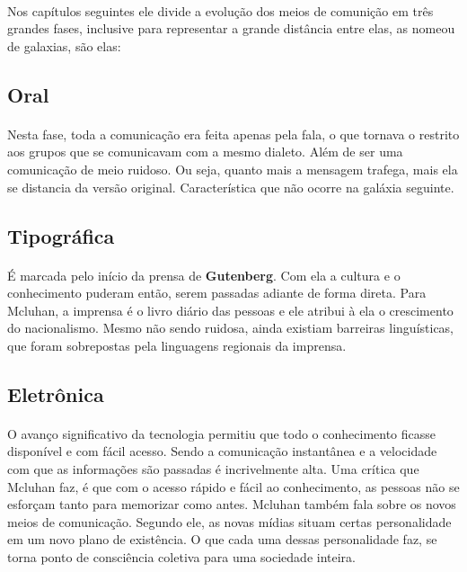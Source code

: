 \documentclass[12pt,a4paper]{article}
\begin{document}
\paragraph{}
Nos capítulos seguintes ele divide a evolução dos meios de comunição \cite{youtube:abc_monday_conference} em três grandes fases, inclusive para representar a grande distância entre elas, as nomeou de galaxias, são elas:

\subsection{Oral}
\paragraph{}
Nesta fase, toda a comunicação era feita apenas pela fala, o que tornava o  restrito aos grupos que se comunicavam com a mesmo dialeto. Além de ser uma comunicação de meio ruidoso. Ou seja, quanto mais a mensagem trafega, mais ela se distancia da versão original. Característica que não ocorre na galáxia seguinte.

\subsection{Tipográfica}

\paragraph{}
É marcada pelo início da prensa de \textbf{Gutenberg}.
Com ela a cultura e o conhecimento puderam então, serem passadas adiante de forma direta.
Para Mcluhan, a imprensa é o livro diário das pessoas e ele atribui à ela o crescimento do nacionalismo. 
Mesmo não sendo ruidosa, ainda existiam barreiras linguísticas, que foram sobrepostas pela linguagens regionais da imprensa.

\subsection{Eletrônica}
\paragraph{}
O avanço significativo da tecnologia permitiu que todo o conhecimento ficasse disponível e com fácil acesso.
Sendo a comunicação instantânea e a velocidade com que as informações são passadas é incrivelmente alta.
Uma crítica que Mcluhan\cite{wiki:marshall_mcluhan} faz, é que com o acesso rápido e fácil ao conhecimento, as pessoas não se esforçam tanto para memorizar como antes. \cite{ted:ted_talk_feats_of_memory_anyone_can_do}
Mcluhan também fala sobre os novos meios de comunicação.
Segundo ele, as novas mídias situam certas personalidade em um novo plano de existência.
O que cada uma dessas personalidade faz, se torna ponto de consciência coletiva para uma sociedade inteira.
\end{document}
